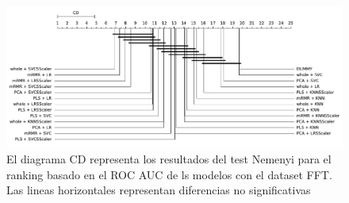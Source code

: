 \documentclass[a4paper,oneside,11pt,leqno]{article}
\begin{document}
	
	\begin{figure}[h]
		\includegraphics[width=\linewidth]{stat_results_fft.pdf}
		\caption{El diagrama CD representa los resultados del test Nemenyi para el ranking basado en el ROC AUC de ls modelos con el dataset FFT. Las lineas horizontales representan diferencias no significativas}
		\label{fig:stats_fig_fft}
	\end{figure}
\end{document}
